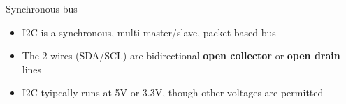 \begin{frame}
   {Synchronous bus}
   \begin{itemize}
      \item I2C is a synchronous, multi-master/slave, packet based bus
      \item The 2 wires (SDA/SCL) are bidirectional \textbf{open collector}
	      or \textbf{open drain} lines
      \item I2C tyipcally runs at 5V or 3.3V, though other voltages are permitted
   \end{itemize}
\end{frame}

\cprotect\note{

}

